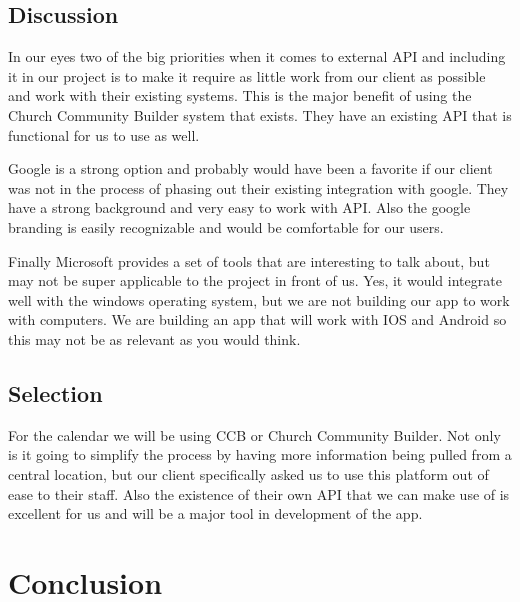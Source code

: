 \documentclass[letterpaper,10pt,draftclsnofoot,onecolumn,titlepage]{IEEEtran}
\begin{document}
	\subsection{Discussion}
	In our eyes two of the big priorities when it comes to external API and including it in our project is to make it require as little work from our client as possible and work with their existing systems. This is the major benefit of using the Church Community Builder system that exists. They have an existing API that is functional for us to use as well.
	
	Google is a strong option and probably would have been a favorite if our client was not in the process of phasing out their existing integration with google. They have a strong background and very easy to work with API. Also the google branding is easily recognizable and would be comfortable for our users.
	
	Finally Microsoft provides a set of tools that are interesting to talk about, but may not be super applicable to the project in front of us. Yes, it would integrate well with the windows operating system, but we are not building our app to work with computers. We are building an app that will work with IOS and Android so this may not be as relevant as you would think.
	\subsection{Selection}
	For the calendar we will be using CCB or Church Community Builder. Not only is it going to simplify the process by having more information being pulled from a central location, but our client specifically asked us to use this platform out of ease to their staff. Also the existence of their own API that we can make use of is excellent for us and will be a major tool in development of the app.
	\clearpage
	\section{Conclusion}

	
	
\end{document}
